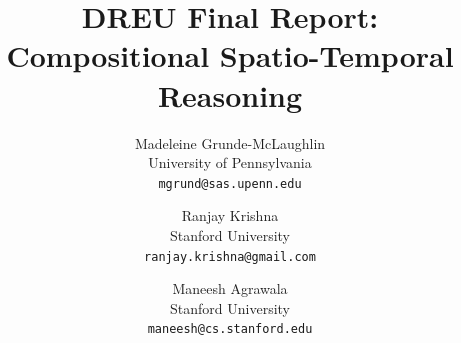 \documentclass[10pt,twocolumn,letterpaper]{article}
\begin{document}
\title{DREU Final Report: Compositional Spatio-Temporal Reasoning}

\author{Madeleine Grunde-McLaughlin\\
University of Pennsylvania\\
{\tt\small mgrund@sas.upenn.edu}

\and
Ranjay Krishna\\
Stanford University\\
{\tt\small ranjay.krishna@gmail.com}

\and
Maneesh Agrawala\\
Stanford University\\
{\tt\small maneesh@cs.stanford.edu}


}
\maketitle
\pagestyle{empty}
\end{document}
